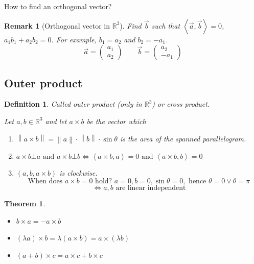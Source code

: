 \documentclass[a4paper]{article}
\newcounter{lecref}[section]
\numberwithin{lecref}{section}
\newtheorem{theorem}[lecref]{Theorem}
\newtheorem{definition}[lecref]{Definition}
\newtheorem*{Remark}{Remark}
\newcommand{\angel}[1]{\left\langle#1\right\rangle}
\newcommand{\norm}[1]{\left\|#1\right\|}
\newcommand{\rh}[1]{\vec{#1}}
\begin{document}
How to find an orthogonal vector?

\begin{Remark}[Orthogonal vector in $\mathbb R^2$]
  Find $\vec{b}$ such that $\angel{\rh{a}, \rh{b}} = 0$, $a_1 b_1 + a_2 b_2 = 0$. For example, $b_1 = a_2$ and $b_2 = -a_1$.
  \[ \rh{a} = \begin{pmatrix} a_1 \\ a_2 \end{pmatrix} \qquad \rh{b} = \begin{pmatrix} a_2 \\ -a_1 \end{pmatrix} \]
\end{Remark}

\subsection{Outer product}

\begin{definition} %
  Called \emph{outer product} (only in $\mathbb R^3$) or \emph{cross product}.

  Let $a, b \in \mathbb R^3$ and let $a \times b$ be the vector which
  \begin{enumerate}
    \item $\norm{a \times b} = \norm{a} \cdot \norm{b} \cdot \sin{\theta}$ is the area of the spanned parallelogram.
    \item $a \times b \bot a \text{ and } a \times b \bot b
      \iff \angel{a \times b, a} = 0 \text{ and } \angel{a \times b, b} = 0$
    \item $(a, b, a \times b)$ is clockwise.
      \[ \text{When does } a \times b = 0 \text{ hold? } a = 0, b = 0, \sin\theta = 0, \text{ hence } \theta = 0 \lor \theta = \pi \]
      \[ \iff a,b \text{ are linear independent} \]
  \end{enumerate}
\end{definition}

\begin{theorem}
  \begin{itemize}
    \item $b \times a = -a \times b$
    \item $(\lambda a) \times b = \lambda (a \times b) = a \times (\lambda b)$
    \item $(a + b) \times c = a \times c + b \times c$
  \end{itemize}
\end{theorem}
\end{document}
